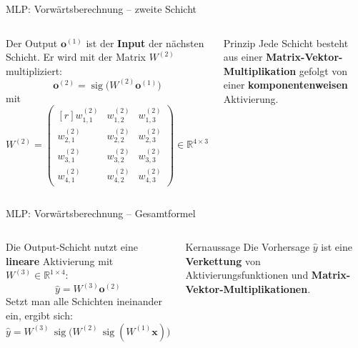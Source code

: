 \begin{frame}{MLP: Vorwärtsberechnung -- zweite Schicht}
\begin{columns}
Der Output $\mathbf{o}^{(1)}$ ist der \textbf{Input} der nächsten Schicht. Er wird
mit der Matrix $W^{(2)}$ multipliziert:
\[
  \mathbf{o}^{(2)} = \operatorname{sig}\bigl(W^{(2)} \mathbf{o}^{(1)}\bigr)
\]
mit
\[
  W^{(2)} =
  \begin{pmatrix*}[r]
    w^{(2)}_{1,1} & w^{(2)}_{1,2} & w^{(2)}_{1,3}\\
    w^{(2)}_{2,1} & w^{(2)}_{2,2} & w^{(2)}_{2,3}\\
    w^{(2)}_{3,1} & w^{(2)}_{3,2} & w^{(2)}_{3,3}\\
    w^{(2)}_{4,1} & w^{(2)}_{4,2} & w^{(2)}_{4,3}
  \end{pmatrix*} \in \mathbb{R}^{4\times 3}
\]

\begin{blockC1}{Prinzip}
Jede Schicht besteht aus einer \textbf{Matrix-Vektor-Multiplikation}
gefolgt von einer \textbf{komponentenweisen} Aktivierung.
\end{blockC1}
\end{columns}
\end{frame}

\begin{frame}{MLP: Vorwärtsberechnung -- Gesamtformel}
\begin{columns}
Die Output-Schicht nutzt eine \textbf{lineare} Aktivierung mit
$W^{(3)} \in \mathbb{R}^{1\times 4}$:
\[
  \hat{y} = W^{(3)} \mathbf{o}^{(2)}
\]
Setzt man alle Schichten ineinander ein, ergibt sich:
\[
  \hat{y} = W^{(3)}\,\operatorname{sig}\bigl(W^{(2)}\,\operatorname{sig}(W^{(1)}\mathbf{x})\bigr)
\]

\begin{blockC1}{Kernaussage}
Die Vorhersage $\hat{y}$ ist eine \textbf{Verkettung} von
Aktivierungsfunktionen und \textbf{Matrix-Vektor-Multiplikationen}.
\end{blockC1}
\end{columns}
\end{frame}


